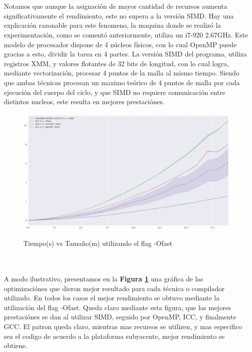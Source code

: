 ~\\
~\\
Notamos que aunque la asignación de mayor cantidad de recursos aumenta significativamente el rendimiento, este no supera a la versión SIMD. Hay una explicación razonable para este fenomeno, la maquina donde se realizó la experimentación, como se comentó anteriormente, utiliza un i7-920 2.67GHz. Este modelo de procesador dispone de 4 núcleos físicos, con lo cual OpenMP puede gracias a esto, dividir la tarea en 4 partes. La versión SIMD del programa, utiliza registros XMM, y valores flotantes de 32 bits de longitud, con lo cual logra, mediante vectorización, procesar 4 puntos de la malla al mismo tiempo. Siendo que ambas técnicas procesan un maximo teórico de 4 puntos de malla por cada ejecución del cuerpo del ciclo, y que SIMD no requiere comunicación entre distintos nucleos, este resulta en mejores prestaciónes.

\begin{figure}[!htbp]
\caption{Tiempo(s) vs Tamaño(m) utilizando el flag -Ofast}
\includegraphics[width=\textwidth]{imagenes/plot_ofast.png}
\label{fig:plot_ofast}
\end{figure}
~\\
~\\

A modo ilustrativo, presentamos en la \textbf{Figura \ref{fig:plot_ofast}} una gráfica de las optimizaciónes que dieron mejor resultado para cada técnica o compilador utilizado. En todos los casos el mejor rendimiento se obtuvo mediante la utilización del flag -Ofast. Queda claro mediante esta figura, que las mejores prestaciónes se dan al utilizar SIMD, seguido por OpenMP, ICC, y finalmente GCC. El patron queda claro, mientras mas recursos se utilizen, y mas especifico sea el codigo de acuerdo a la plataforma subyacente, mejor rendimiento se obtiene. 



